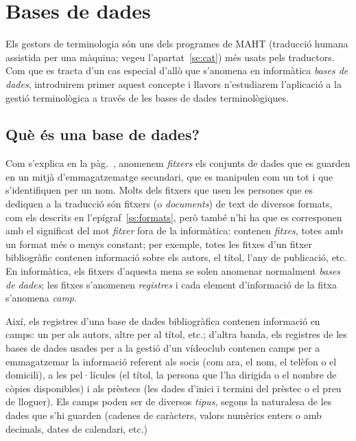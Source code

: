 \chapter{Bases de dades}
\label{se:basesdades}

  Els gestors de terminologia són uns dels programes de MAHT (traducció
 humana assistida per una màquina; vegeu
 l'apartat~\ref{se:cat})
  més usats pels
  traductors. Com que es tracta d'un cas especial d'allò que s'anomena
 en informàtica
 \emph{bases de dades}, introduirem primer aquest concepte i llavors
 n'estudiarem l'aplicació a la gestió terminològica
 a través de les bases de dades terminològiques.


\section{Què és una base de dades?} 

Com s'explica en la pàg.~\pageref{pg:fitxer}, anomenem
\emph{fitxers} els conjunts de dades que es guarden en un mitjà
d'emmagatzematge secundari, que es manipulen com un tot i que
s'identifiquen per un nom. Molts dels fitxers que usen les persones
que es dediquen a la traducció són fitxers (o \emph{documents}) de
text de diversos formats, com els descrits en
l'epígraf~\ref{ss:formats}, però també n'hi ha que es corresponen amb
el significat del mot \emph{fitxer} fora de la informàtica: contenen
\emph{fitxes}, totes amb un format més o menys constant; per exemple,
totes les fitxes d'un fitxer bibliogràfic contenen informació sobre
els autors, el títol, l'any de publicació, etc. En informàtica, els
fitxers d'aquesta mena se solen anomenar normalment \emph{bases de
  dades}; les fitxes s'anomenen \emph{registres} i cada element
d'informació de la fitxa s'anomena \emph{camp}. 

Així, els registres
d'una base de dades bibliogràfica contenen informació en camps: un per
als autors, altre per al títol, etc.; 
  d'altra banda, 
  els registres de les bases de dades usades per a la
  gestió d'un vídeoclub
  contenen camps per a emmagatzemar la informació referent als socis
  (com ara, el nom, el telèfon o el domicili),
  a les pel·lícules (el títol, la persona que l'ha dirigida o el nombre
  de còpies disponibles) i als prèstecs (les dades d'inici i termini
  del prèstec o el preu de lloguer). Els camps poden ser de diversos
  \emph{tipus}, segons la naturalesa de les dades que s'hi guarden
  (cadenes de caràcters, valors numèrics enters o amb decimals, dates
  de calendari, etc.)

